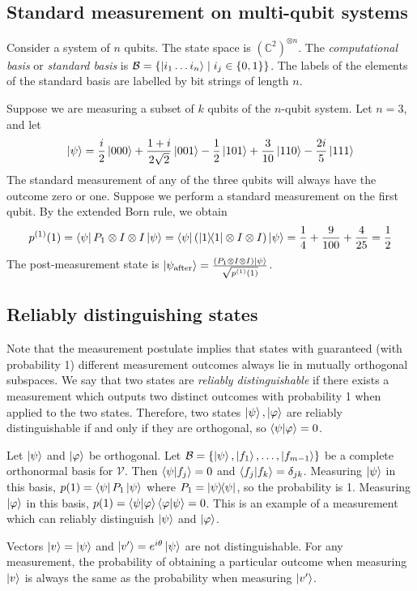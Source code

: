 \subsection{Standard measurement on multi-qubit systems}
Consider a system of \( n \) qubits.
The state space is \( (\mathbb C^2)^{\otimes n} \).
The \emph{computational basis} or \emph{standard basis} is \( \mathcal B = \qty{\ket{i_1 \dots i_n} \mid i_j \in \qty{0,1}} \).
The labels of the elements of the standard basis are labelled by bit strings of length \( n \).

Suppose we are measuring a subset of \( k \) qubits of the \( n \)-qubit system.
Let \( n = 3 \), and let
\[ \ket{\psi} = \frac{i}{2} \ket{000} + \frac{1+i}{2\sqrt{2}} \ket{001} - \frac{1}{2} \ket{101} + \frac{3}{10} \ket{110} - \frac{2i}{5} \ket{111} \]
The standard measurement of any of the three qubits will always have the outcome zero or one.
Suppose we perform a standard measurement on the first qubit.
By the extended Born rule, we obtain
\[ p^{(1)}(1) = \bra{\psi} P_1 \otimes I \otimes I \ket{\psi} = \bra{\psi} \qty(\op{1}{1} \otimes I \otimes I) \ket{\psi} = \frac{1}{4} + \frac{9}{100} + \frac{4}{25} = \frac{1}{2} \]
The post-measurement state is \( \ket{\psi_{\text{after}}} = \frac{(P_1 \otimes I \otimes I)\ket{\psi}}{\sqrt{p^{(1)}(1)}} \).

\subsection{Reliably distinguishing states}
Note that the measurement postulate implies that states with guaranteed (with probability 1) different measurement outcomes always lie in mutually orthogonal subspaces.
We say that two states are \emph{reliably distinguishable} if there exists a measurement which outputs two distinct outcomes with probability 1 when applied to the two states.
Therefore, two states \( \ket{\psi}, \ket{\varphi} \) are reliably distinguishable if and only if they are orthogonal, so \( \ip{\psi}{\varphi} = 0 \).

Let \( \ket{\psi} \) and \( \ket{\varphi} \) be orthogonal.
Let \( \mathcal B = \qty{\ket{\psi}, \ket{f_1}, \dots, \ket{f_{m-1}}} \) be a complete orthonormal basis for \( \mathcal V \).
Then \( \ip{\psi}{f_j} = 0 \) and \( \ip{f_j}{f_k} = \delta_{jk} \).
Measuring \( \ket{\psi} \) in this basis, \( p(1) = \bra{\psi} P_1 \ket{\psi} \) where \( P_1 = \op{\psi}{\psi} \), so the probability is 1.
Measuring \( \ket{\varphi} \) in this basis, \( p(1) = \ip{\psi}{\varphi} \ip{\varphi}{\psi} = 0 \).
This is an example of a measurement which can reliably distinguish \( \ket{\psi} \) and \( \ket{\varphi} \).

Vectors \( \ket{v} = \ket{\psi} \) and \( \ket{v'} = e^{i\theta} \ket{\psi} \) are not distinguishable.
For any measurement, the probability of obtaining a particular outcome when measuring \( \ket{v} \) is always the same as the probability when measuring \( \ket{v'} \).
